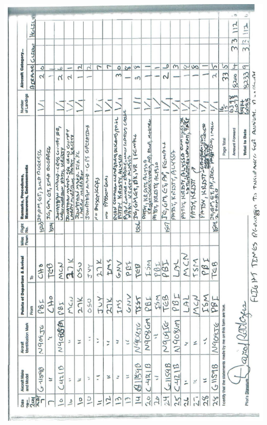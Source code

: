 \documentclass[10pt]{article}
\begin{document}
\includegraphics[max width=\textwidth, center]{2025_02_27_dd68c3d38de88f0516d9g-087}\\
\end{document}
